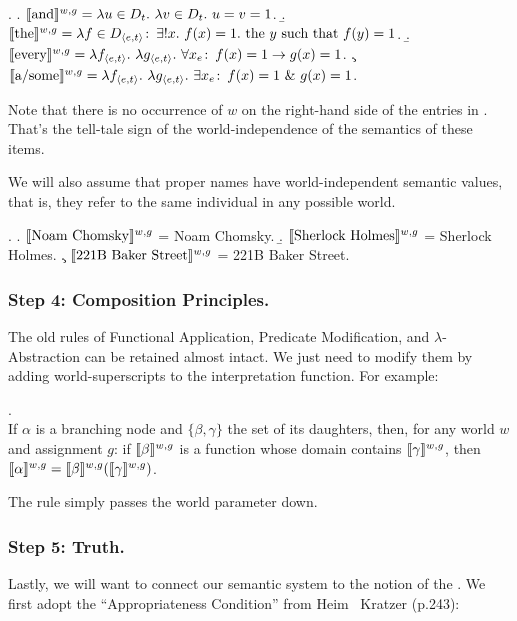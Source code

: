 \ex. \a. $\llbracket \mbox{and} \rrbracket^{w,g} = \lambda u \in D_t.\ \lambda v \in D_t.\ u=v=1 $. 
\b. $\llbracket \mbox{the} \rrbracket^{w,g} = \lambda f \in D_{\langle e,t \rangle}\colon\thinspace \exists ! x.\ f(x) = 1. \mbox{ the } y \mbox{ such that } f(y) = 1$. 
\b. $\llbracket \mbox{every} \rrbracket^{w,g} = \lambda f_{\langle e,t \rangle}.\ \lambda g_{\langle e,t \rangle}.\ \forall x_e\colon\thinspace f(x) = 1 \rightarrow g(x) = 1 $. 
\c. $\sv{\mbox{a/some}}^{w,g} = \lambda f_{\angles{e,t}}.\ \lambda g_{\angles{e,t}}.\ \exists x_e\co f(x) = 1\ \&\ g(x) = 1 $.

Note that there is no occurrence of $w$ on the right-hand side of the entries in \Last. That's the tell-tale sign of the world-independence of the semantics of these items.

We will also assume that proper names have world-independent semantic values, that is, they refer to the same individual in any possible world.

\ex. \a. $\llbracket \mbox{Noam Chomsky} \rrbracket^{w,g}$ = Noam Chomsky. \b. $\llbracket \mbox{Sherlock Holmes} \rrbracket^{w,g}$ = Sherlock Holmes. \c. $\llbracket \mbox{221B Baker Street} \rrbracket^{w,g}$ = 221B Baker Street.

\subsubsection{Step 4: Composition Principles.} \label{sec:comp-princ}

The old rules of Functional Application, Predicate Modification, and $\lambda$-Abstraction can be retained almost intact. We just need to modify them by adding world-superscripts to the interpretation function. For example:

\ex. \\
If $\alpha$ is a branching node and $\{\beta, \gamma\}$ the set of its daughters, then, for any world $w$ and assignment $g$: if $\llbracket \beta \rrbracket^{w,g}$ is a function whose domain contains $\llbracket \gamma \rrbracket^{w,g}$, then $\llbracket \alpha \rrbracket^{w,g} = \llbracket \beta \rrbracket^{w,g} (\llbracket \gamma \rrbracket^{w,g})$.

The rule simply passes the world parameter down.

\subsubsection{Step 5: Truth.} \label{sec:truth}

Lastly, we will want to connect our semantic system to the notion of the . We first adopt the ``Appropriateness Condition'' from Heim \amp\ Kratzer (p.243):

